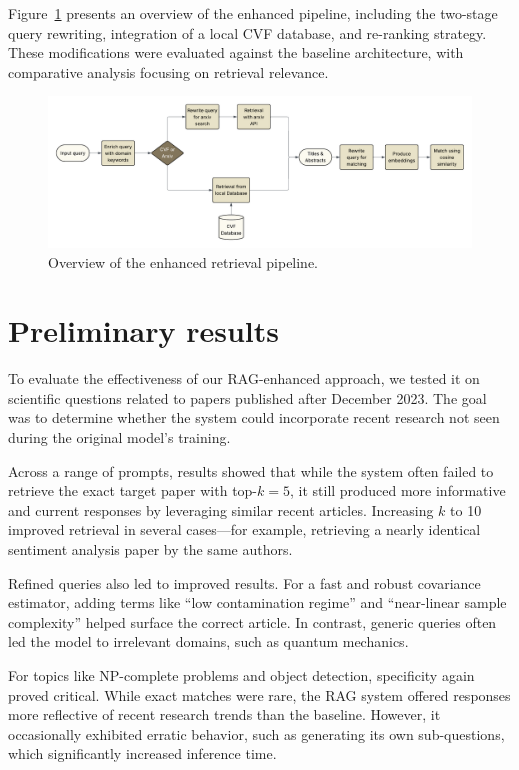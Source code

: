 \documentclass[fleqn,moreauthors,10pt]{ds_report}
\begin{document}
Figure~\ref{fig:retrieval_pipeline} presents an overview of the enhanced 
pipeline, including the two-stage query rewriting, integration of a
 local CVF database, and re-ranking strategy. These modifications were 
 evaluated against the baseline architecture, with comparative analysis 
 focusing on retrieval relevance.


\begin{figure}[h]
    \centering
    \includegraphics[width=\textwidth]{fig/flowchart.pdf}
    \caption{Overview of the enhanced retrieval pipeline.}
    \label{fig:retrieval_pipeline}
\end{figure}







\section*{Preliminary results }
To evaluate the effectiveness of our RAG-enhanced approach, we tested it on scientific
 questions related to papers published after December 2023. The goal was to determine 
 whether the system could incorporate recent research not seen during the original
  model’s training.

Across a range of prompts, results showed that while the system often failed to retrieve 
the exact target paper with top-$k=5$, it still produced more informative and current responses by leveraging similar recent articles. Increasing $k$ to 10 improved retrieval in several cases—for example, retrieving a nearly identical sentiment analysis paper by the same authors.

Refined queries also led to improved results. For a fast and robust covariance estimator, adding terms like “low contamination regime” and “near-linear sample complexity” helped surface the correct article. In contrast, generic queries often led the model to irrelevant domains, such as quantum mechanics.

For topics like NP-complete problems and object detection, specificity again proved critical. While exact matches were rare, the RAG system offered responses more reflective of recent research trends than the baseline. However, it occasionally exhibited erratic behavior, such as generating its own sub-questions, which significantly increased inference time.
\end{document}
